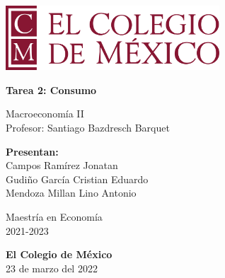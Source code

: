 \begin{titlepage}
   \begin{center}
       \vspace*{1cm}
      
        \includegraphics[width=0.6\textwidth]{COLMEX.png}
        
        \vspace*{1cm}

       \textbf{Tarea 2: Consumo}

       \vspace{0.5cm}
        Macroeconomía II \\
        \vspace{0.5cm}
        Profesor: Santiago Bazdresch Barquet
            
       \vspace{1.5cm}

       \textbf{Presentan:} \\
       \vspace{0.5cm}
        Campos Ramírez Jonatan\\ 
       Gudiño García Cristian Eduardo\\ 
       Mendoza Millan Lino Antonio 
       
       

       \vspace{3cm}
            
       Maestría en Economía\\
       2021-2023
            
       \vspace{0.8cm}
     
            
       \textbf{El Colegio de México}\\
        23 de marzo del 2022
            
   \end{center}
\end{titlepage}